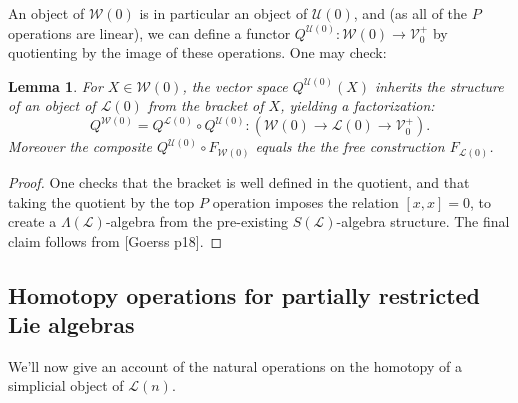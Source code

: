 \documentclass[11pt]{amsart}
\theoremstyle{plain}
\newtheorem{lem}[thm]{Lemma}
\theoremstyle{definition}
\renewcommand{\to}{\longrightarrow}
\newcommand{\scrL}{\mathscr{L}}
\newcommand{\calW}{\mathcal{W}}
\newcommand{\calU}{\mathcal{U}}
\newcommand{\calL}{\mathcal{L}}
\newcommand{\calV}{\mathcal{V}}
\theoremstyle{plain}
\newcommand{\LieOperad}{{\scrL}}
\newcommand{\vect}[2]{\calV^{#1}_{#2}}
\begin{document}
\begin{Lie algebras in characteristic 2 and their homotopy operations}
An object of $\calW(0)$ is in particular an object of $\calU(0)$, and (as all of the $P$ operations are linear), we can define a functor $Q^{\calU(0)}:\calW(0)\to\vect{+}{0}$ by quotienting by the image of these operations. One may check:
\begin{lem}\label{Kill P ops gives lie alg}
For $X\in\calW(0)$, the vector space $Q^{\calU(0)}(X)$ inherits the structure of an object of $\calL(0)$ from the bracket of $X$, yielding a factorization:%
\[Q^{\calW(0)}=Q^{\calL(0)}\circ Q^{\calU(0)}:\left(\calW(0)\to \calL(0)\to \vect{+}{0}\right).\]
Moreover the composite $Q^{\calU(0)}\circ F_{\calW(0)}$ equals the the free construction $F_{\calL(0)}$.
\end{lem}
\begin{proof}
One checks that the bracket is well defined in the quotient, and that taking the quotient by the top $P$ operation imposes the relation $[x,x]=0$, to create a $\Lambda(\LieOperad)$-algebra from the pre-existing $S(\LieOperad)$-algebra structure. The final claim follows from [Goerss p18].
\end{proof}


\subsection{Homotopy operations for partially restricted Lie algebras}
We'll now give an account of the natural operations on the homotopy of a simplicial object of $\calL(n)$.


\end{Lie algebras in characteristic 2 and their homotopy operations}
\end{document}
